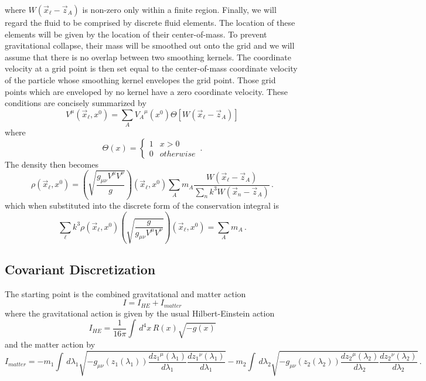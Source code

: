 where $W(\vec x_{\ell} - \vec z_A)$ is non-zero only within a 
finite region.
Finally, we will regard the fluid to be comprised by 
discrete fluid elements.
The location of these elements will be given by the location
of their center-of-mass.
To prevent gravitational collapse, their mass will be
smoothed out onto the grid and we will assume that there is no overlap
between two smoothing kernels.
The coordinate velocity at a grid point is then set equal to
the center-of-mass coordinate velocity of the particle whose 
smoothing kernel envelopes the grid point.  
Those grid points which are enveloped by no kernel have a zero 
coordinate velocity.  
These conditions are concisely summarized by 
\[
  V^{\mu}( \vec x_{\ell},x^0) =    \sum _A {V_A}^{\mu}(x^0) 
                                            \Theta \left[ W(\vec x_{\ell} - \vec z_A) 
											       \right]
\]
where 
\[
  \Theta(x) = \left\{
                     \begin{array}{cc}
					   1  & x > 0 \\
					   0  & otherwise
					 \end{array}
			   \right. \, .
\]
The density then becomes
\[
  \rho(\vec x_{\ell},x^0) = \left(
                              \sqrt{
                                    \frac{g_{\mu \nu} V^{\mu} V^{\nu}}{g}
                                    }
                              \right)(\vec x_{\ell},x^0)
            \sum _A m_A \frac{W(\vec x_{\ell} - \vec z_A)}
			                 {\sum _n k^3 W(\vec x_n - \vec z_A)} \, .
\]
which when substituted into the discrete form of the 
conservation integral is
\[
  \sum _{\ell} k^3 \rho( \vec x_{\ell},x^0)
                   \left( 
                   \sqrt{
				      \frac{g}{ g_{\mu \nu} V^{\mu} V^{\nu} } 
					    }
				   \right)(\vec x_{\ell},x^0)
				   =
				   \sum _A m_A \, .
\]


\subsection{Covariant Discretization}

The starting point is the combined gravitational and matter action 
\[
  I = I_{HE} + I_{matter}
\]
where the gravitational action is given by the usual
Hilbert-Einstein action
\[
  I_{HE} = \frac{1}{16 \pi} \int \, d^4 x \, R(x) \sqrt{ -g(x) } 
\]
and the matter action by
\[
  I_{matter} = - m_1 \int \, d \lambda_1 
                     \sqrt{ -g_{\mu \nu}(z_1(\lambda_1)) 
					        \frac{d {z_1}^{\mu}(\lambda_1)}{d \lambda_1} 
					        \frac{d {z_1}^{\nu}(\lambda_1)}{d \lambda_1} }
               - m_2 \int \, d \lambda_2 
                     \sqrt{ -g_{\mu \nu}(z_2(\lambda_2)) 
					        \frac{d {z_2}^{\mu}(\lambda_2)}{d \lambda_2} 
					        \frac{d {z_2}^{\nu}(\lambda_2)}{d \lambda_2} }\, .				
\]

